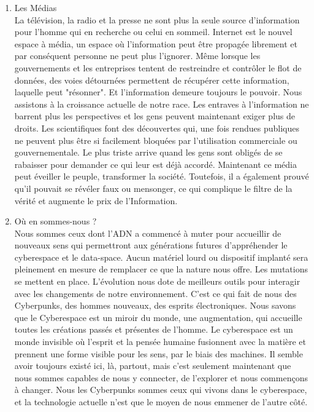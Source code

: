 \documentclass[11pt,twoside,a4paper]{book}
\begin{document}
\begin{enumerate}
		~\\
	\item[IV.] Les M{\'e}dias ~\\
		La t{\'e}l{\'e}vision, la radio et la presse ne sont plus la seule source d'information pour l'homme qui en recherche ou celui en sommeil. Internet est le nouvel espace {\`a} m{\'e}dia, un espace o{\`u} l'information peut {\^e}tre propag{\'e}e librement et par cons{\'e}quent personne ne peut plus l'ignorer. M{\^e}me lorsque les gouvernements et les entreprises tentent de restreindre et contr{\^o}ler le flot de donn{\'e}es, des voies d{\'e}tourn{\'e}es permettent de r{\'e}cup{\'e}rer cette information, laquelle peut "r{\'e}sonner". Et l'information demeure toujours le pouvoir. Nous assistons {\`a} la croissance actuelle de notre race. Les entraves {\`a} l'information ne barrent plus les perspectives et les gens peuvent maintenant exiger plus de droits. Les scientifiques font des d{\'e}couvertes qui, une fois rendues publiques ne peuvent plus {\^e}tre si facilement bloqu{\'e}es par l'utilisation commerciale ou gouvernementale. Le plus triste arrive quand les gens sont oblig{\'e}s de se rabaisser pour demander ce qui leur est d{\'e}j{\`a} accord{\'e}. Maintenant ce m{\'e}dia peut {\'e}veiller le peuple, transformer la soci{\'e}t{\'e}. Toutefois, il a {\'e}galement prouv{\'e} qu'il pouvait se r{\'e}v{\'e}ler faux ou mensonger, ce qui complique le filtre de la v{\'e}rit{\'e} et augmente le prix de l'Information.
	\item[V.] O{\`u} en sommes-nous ? ~\\
		Nous sommes ceux dont l'ADN a commenc{\'e} {\`a} muter pour accueillir de nouveaux sens qui permettront aux g{\'e}n{\'e}rations futures d'appr{\'e}hender le cyberespace et le data-space. Aucun mat{\'e}riel lourd ou dispositif implant{\'e} sera pleinement en mesure de remplacer ce que la nature nous offre. Les mutations se mettent en place. L'{\'e}volution nous dote de meilleurs outils pour interagir avec les changements de notre environnement. C'est ce qui fait de nous des Cyberpunks, des hommes nouveaux, des esprits {\'e}lectroniques. Nous savons que le Cyberespace est un miroir du monde, une augmentation, qui accueille toutes les cr{\'e}ations pass{\'e}s et pr{\'e}sentes de l'homme. Le cyberespace est un monde invisible o{\`u} l'esprit et la pens{\'e}e humaine fusionnent avec la mati{\`e}re et prennent une forme visible pour les sens, par le biais des machines. Il semble avoir toujours exist{\'e} ici, l{\`a}, partout, mais c'est seulement maintenant que nous sommes capables de nous y connecter, de l'explorer et nous commen\c{c}ons {\`a} changer. Nous les Cyberpunks sommes ceux qui vivons dans le cyberespace, et la technologie actuelle n'est que le moyen de nous emmener de l'autre c{\^o}t{\'e}.
\end{enumerate}
\end{document}
